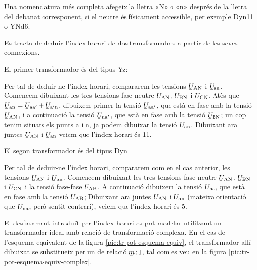 Una nomenclatura més completa afegeix la lletra «N» o «n» després de la lletra del debanat corresponent, si el neutre és físicament accessible, per exemple Dyn11 o YNd6.


\begin{exemple}
    Es tracta de deduir l'índex horari de dos transformadors a partir de les seves connexions.


    El primer transformador és del tipus Yz:
     \vspace{-2mm}
    \begin{center}
        
    \end{center}
     Per tal de deduir-ne l'índex horari, compararem les tensions
    $\cmplx{U}\ped{AN}$ i $\cmplx{U}\ped{an}$. Comencem dibuixant les tres tensions fase-neutre $\cmplx{U}\ped{AN}$, $\cmplx{U}\ped{BN}$ i $\cmplx{U}\ped{CN}$. Atès que $\cmplx{U}\ped{an} = \cmplx{U}\ped{aa'} + \cmplx{U}\ped{a'n}$, dibuixem primer la tensió $\cmplx{U}\ped{aa'}$, que està en fase amb la tensió $\cmplx{U}\ped{AN}$, i a continuació la tensió $\cmplx{U}\ped{na'}$, que està en fase amb la tensió $\cmplx{U}\ped{BN}$; un cop tenim situats els punts a i n, ja podem dibuixar la tensió $\cmplx{U}\ped{an}$. Dibuixant ara juntes $\cmplx{U}\ped{AN}$ i $\cmplx{U}\ped{an}$  veiem que l'índex horari és 11.


     El segon transformador és del tipus Dyn:
      \vspace{-2mm}
    \begin{center}
       
    \end{center}
      Per tal de deduir-ne l'índex horari, compararem com en el cas anterior, les tensions $\cmplx{U}\ped{AN}$ i $\cmplx{U}\ped{an}$. Comencem dibuixant les tres tensions fase-neutre $\cmplx{U}\ped{AN}$, $\cmplx{U}\ped{BN}$ i $\cmplx{U}\ped{CN}$ i la tensió fase-fase $\cmplx{U}\ped{AB}$.  A continuació dibuixem la tensió $\cmplx{U}\ped{na}$, que està en fase amb la tensió $\cmplx{U}\ped{AB}$; Dibuixant ara juntes $\cmplx{U}\ped{AN}$ i $\cmplx{U}\ped{an}$ (mateixa orientació que $\cmplx{U}\ped{na}$, però sentit contrari),  veiem que l'índex horari és 5.
\end{exemple}

El desfasament introduït per l'índex horari es pot modelar utilitzant  un transformador ideal amb relació de transformació complexa. En el cas de l'esquema equivalent de la figura  \vref{pic:tr-pot-esquema-equiv}, el transformador allí dibuixat
se substitueix per un de relació $\cmplx{m}\!:\!1$, tal com es veu en la figura \vref{pic:tr-pot-esquema-equiv-complex}.

